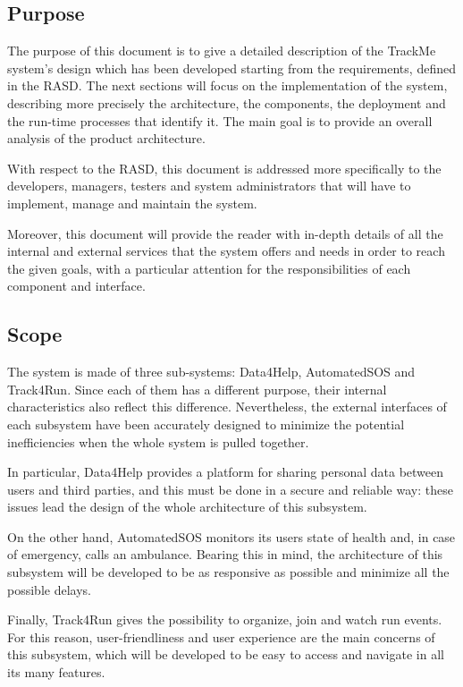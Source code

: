 \subsection{Purpose}

The purpose of this document is to give a detailed description of the TrackMe system's design which has been developed starting from the requirements, defined in the RASD. The next sections will focus on the implementation of the system, describing more precisely the architecture, the components, the deployment  and the run-time processes that identify it.
The main goal is to provide an overall analysis of the product architecture.

With respect to the RASD, this document is addressed more specifically to the developers, managers, testers and system administrators that will have to implement, manage and maintain the system.

Moreover, this document will provide the reader with in-depth details of all the internal and external services that the system offers and needs in order to reach the given goals, with a particular attention for the responsibilities of each component and interface.
 
\subsection{Scope}

The system is made of three sub-systems: Data4Help, AutomatedSOS and Track4Run. 
Since each of them has a different purpose, their internal characteristics also reflect this difference. Nevertheless, the external interfaces of each subsystem have been accurately designed to minimize the potential inefficiencies when the whole system is pulled together.

In particular, Data4Help provides a platform for sharing personal data between users and third parties, and this must be done in a secure and reliable way: these issues lead the design of the whole architecture of this subsystem.

On the other hand, AutomatedSOS monitors its users state of health and, in case of emergency, calls an ambulance. Bearing this in mind, the architecture of this subsystem will be developed to be as responsive as possible and minimize all the possible delays.

Finally, Track4Run gives the possibility to organize, join and watch run events. For this reason, user-friendliness and user experience are the main concerns of this subsystem, which will be developed to be easy to access and navigate in all its many features.

